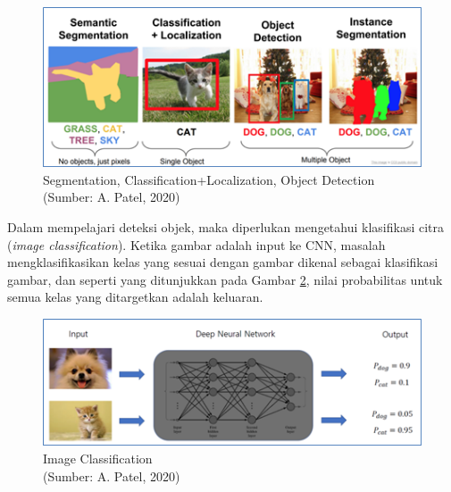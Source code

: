 \begin{figure}[H]
	\vspace{-0.1cm}
	\begin{center}
		\includegraphics[width=1\columnwidth]{bab2/Gambar/Picture3.png}
	\end{center}
	\vspace{-0.2cm}
	\caption{Segmentation, Classification+Localization, Object Detection\\(Sumber: A. Patel, 2020)}\label{img:Segementation-Classification}
\end{figure}

Dalam mempelajari deteksi objek, maka diperlukan mengetahui klasifikasi citra (\textit{image classification}). Ketika gambar adalah input ke CNN, masalah mengklasifikasikan kelas yang sesuai dengan gambar dikenal sebagai klasifikasi gambar, dan seperti yang ditunjukkan pada Gambar \ref{img:Image-Classification}, nilai probabilitas untuk semua kelas yang ditargetkan adalah keluaran.

\begin{figure}[H]
	\vspace{-0.1cm}
	\begin{center}
		\includegraphics[width=1\columnwidth]{bab2/Gambar/Picture4.png}
	\end{center}
	\vspace{-0.2cm}
	\caption{Image Classification\\(Sumber: A. Patel, 2020)}\label{img:Image-Classification}
\end{figure}

